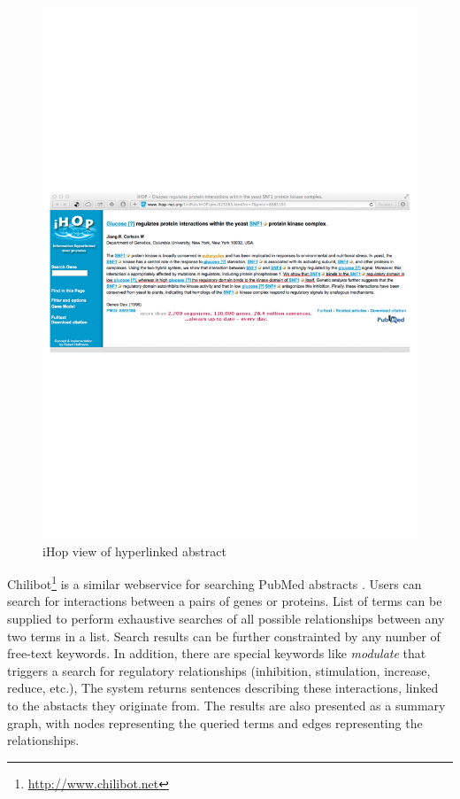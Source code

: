 \begin{figure}
\begin{center}
\includegraphics[scale=0.6]{figures/ihop-3.pdf}
 \caption{iHop view of hyperlinked abstract}
\label{fig:ihop-3}
\end{center}
\end{figure}

Chilibot\footnote{\url{http://www.chilibot.net}} is a similar webservice for searching PubMed abstracts \citep{Chen2004Contentrich}.
Users can search for interactions between a pairs of genes or proteins.
List of terms can be supplied to perform exhaustive searches of all possible relationships between any two terms in a list.
Search results can be further constrainted by any number of free-text keywords.
In addition, there are special keywords like \emph{modulate} that triggers a search for regulatory relationships (inhibition, stimulation, increase, reduce, etc.),  
The system returns sentences describing these interactions, linked to the abstacts they originate from.
The results are also presented as a summary graph, with nodes representing the queried terms and edges representing the relationships.

